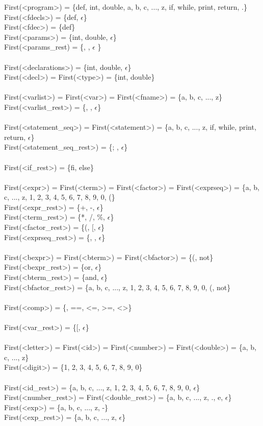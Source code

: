 \documentclass{article}
\begin{document}
\noindent
First(<program>) = \{def, int, double, a, b, c, ..., z, if, while, print, return, .\} \\
First(<fdecls>) = \{def, $\epsilon$\}\\
First(<fdec>) = \{def\}\\
First(<params>) = \{int, double, $\epsilon$\}\\
First(<params\_rest) = \{, , $\epsilon$ \}\\
\\
First(<declarations>) = \{int, double, $\epsilon$\}\\
First(<decl>)  = First(<type>) = \{int, double\}\\
\\
First(<varlist>) = First(<var>) = First(<fname>) = \{a, b, c, ..., z\}\\
First(<varlist\_rest>) = \{, , $\epsilon$\}\\
\\
First(<statement\_seq>) = First(<statement>) = \{a, b, c, ..., z, if, while, print, return, $\epsilon$\}\\
First(<statement\_seq\_rest>) = \{; , $\epsilon$\}\\
\\
First(<if\_rest>) = \{fi, else\}\\
\\
First(<expr>) = First(<term>) = First(<factor>) = First(<exprseq>) = \{a, b, c, ..., z, 1, 2, 3, 4, 5, 6, 7, 8, 9, 0, (\}\\
First(<expr\_rest>) = \{+, -, $\epsilon$\}\\
First(<term\_rest>) = \{*, /, \%, $\epsilon$\}\\
First(<factor\_rest>) = \{(, [, $\epsilon$\}\\
First(<exprseq\_rest>) = \{, , $\epsilon$\}\\
\\
First(<bexpr>) = First(<bterm>) = First(<bfactor>) = \{(, not\}\\
First(<bexpr\_rest>) = \{or, $\epsilon$\}\\
First(<bterm\_rest>) = \{and, $\epsilon$\}\\
First(<bfactor\_rest>) = \{a, b, c, ..., z, 1, 2, 3, 4, 5, 6, 7, 8, 9, 0, (, not\}\\
\\
First(<comp>) = \{<, >, ==, <=, >=, <>\}\\
\\
First(<var\_rest>) = \{[, $\epsilon$\}\\
\\
First(<letter>) = First(<id>) = First(<number>) = First(<double>) = \{a, b, c, ..., z\}\\
First(<digit>) = \{1, 2, 3, 4, 5, 6, 7, 8, 9, 0\}\\
\\
First(<id\_rest>) = \{a, b, c, ..., z, 1, 2, 3, 4, 5, 6, 7, 8, 9, 0, $\epsilon$\}\\
First(<number\_rest>) = First(<double\_rest>) = \{a, b, c, ..., z, ., e, $\epsilon$\}\\
First(<exp>) = \{a, b, c, ..., z, -\}\\
First(<exp\_rest>) = \{a, b, c, ..., z, $\epsilon$\}\\
\end{document}
